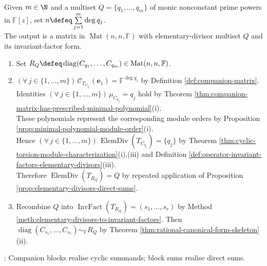 \begin{computationmethod} \label{meth:construct-operator-from-elementary-divisors} \\
Given $m\in\N$ and a multiset $Q=\{q_1,\ldots,q_m\}$ of monic nonconstant prime powers in $\mathbb{F}[z]$, set $n\defeq\sum\limits_{j=1}^m\deg q_j$.\\
The output is a matrix in $\operatorname{Mat}(n,n,\mathbb{F})$ with elementary-divisor multiset $Q$ and its invariant-factor form.
\begin{enumerate}[label=(\roman*)]
\setlength{\itemsep}{0pt}
\item Set $R_Q\defeq\operatorname{diag}(C_{q_1},\ldots,C_{q_m})\in\operatorname{Mat}(n,n,\mathbb{F})$.
\item $(\forall\,j\in\{1,\ldots,m\})\,\mathcal{C}_{T_{C_{q_j}}}(\mathbf{e}_1)=\mathbb{F}^{\deg q_j}$ by Definition \ref{def:companion-matrix}. Identities $(\forall\,j\in\{1,\ldots,m\})\,\mu_{C_{q_j}}=q_j$ hold by Theorem \ref{thm:companion-matrix-has-prescribed-minimal-polynomial}(i).\\
These polynomials represent the corresponding module orders by Proposition \ref{prop:minimal-polynomial-module-order}(i).\\
Hence $(\forall\,j\in\{1,\ldots,m\})\,\operatorname{ElemDiv}(T_{C_{q_j}})=\{q_j\}$ by Theorem \ref{thm:cyclic-torsion-module-characterization}(i),(iii) and Definition \ref{def:operator-invariant-factors-elementary-divisors}(iii).\\
Therefore $\operatorname{ElemDiv}(T_{R_Q})=Q$ by repeated application of Proposition \ref{prop:elementary-divisors-direct-sums}.
\item Recombine $Q$ into $\operatorname{InvFact}(T_{R_Q})=(s_1,\ldots,s_r)$ by Method \ref{meth:elementary-divisors-to-invariant-factors}. Then $\operatorname{diag}(C_{s_1},\ldots,C_{s_r})\sim_{\mathbb{F}}R_Q$ by Theorem \ref{thm:rational-canonical-form-skeleton}(ii).
\end{enumerate}
: Companion blocks realise cyclic summands; block sums realise direct sums.
\end{computationmethod}

